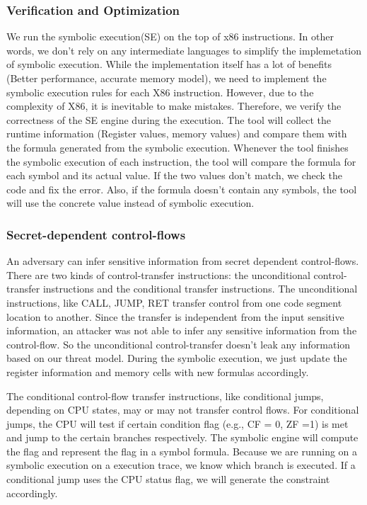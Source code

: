 \subsubsection{Verification and Optimization}
We run the symbolic execution(SE) on the top of x86 instructions.
In other words, we don’t rely on any intermediate languages to 
simplify the implemetation of symbolic execution. 
While the implementation itself 
has a lot of benefits (Better performance, accurate memory model), 
we need to implement the symbolic execution 
rules for each X86 instruction. 
However, due to the complexity of X86, it is inevitable to make mistakes. 
Therefore, we verify the correctness of the SE engine during the execution. 
The tool will collect the runtime information (Register values, 
memory values) and compare them with the formula generated from the 
symbolic execution. Whenever the tool finishes the symbolic execution 
of each instruction, the tool will compare the formula for each symbol 
and its actual value. If the two values don’t match, we check the code
and fix the error. Also, if the formula doesn’t contain any symbols,
the tool will use the concrete value instead of symbolic execution.

\subsubsection{Secret-dependent control-flows}
An adversary can infer sensitive information from secret dependent control-flows. 
There are two kinds of control-transfer instructions: the unconditional 
control-transfer instructions and the conditional transfer instructions.
The unconditional instructions, like CALL, JUMP, RET transfer control
from one code segment location to another. Since the transfer is 
independent from the input sensitive information, an attacker was 
not able to infer any sensitive information from the control-flow. 
So the unconditional control-transfer doesn't leak any information 
based on our threat model. During the symbolic execution, 
we just update the register information and memory cells with 
new formulas accordingly.

The conditional control-flow transfer instructions, like conditional jumps,
depending on CPU states, may or may not transfer control flows.
For conditional jumps, the CPU will test if certain condition flag 
(e.g., CF = 0, ZF =1) is met and jump to the certain branches respectively.
The symbolic engine will compute the flag and represent the flag 
in a symbol formula. Because we are running on a symbolic execution 
on a execution trace, we know which branch is executed.
If a conditional jump uses the CPU status flag, we will generate 
the constraint accordingly.

